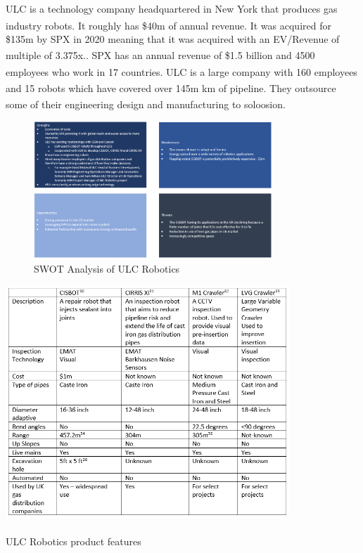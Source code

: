 \documentclass[11pt]{article}		%
\newcommand{\supercite}[1]{\textsuperscript{\cite{#1}}}		%
\begin{document}
	        ULC is a technology company headquartered in New York that  produces gas industry robots. It roughly has \$40m of annual revenue.\supercite{SPX_acquisition} It was acquired for \$135m by SPX in 2020 meaning that it was acquired with an EV/Revenue of multiple of 3.375x.\supercite{SPX_multiple}.  SPX has an annual revenue of \$1.5 billion and 4500 employees who work in 17 countries.\supercite{SPX_acquisition} ULC is a large company with 160 employees and  15 robots which have covered over 145m km of pipeline.\supercite{ULC_news} They outsource some of their engineering design and manufacturing to soloosion.\supercite{soloosian}
	        

            \begin{figure}[h]
				\centering
				\includegraphics[width=0.8\textwidth]{SWOT of ULC.PNG}
				\caption{SWOT Analysis of ULC Robotics}
				\label{ULCSwot}
			\end{figure}
            
            \begin{table}[h]
				\centering
				\includegraphics[width=0.8\textwidth]{ulc robots 2.PNG}
				\caption{ULC Robotics product features\supercite{ULC_Robots}}
				\label{ULCFeatures}
			\end{table}
        
\end{document}
